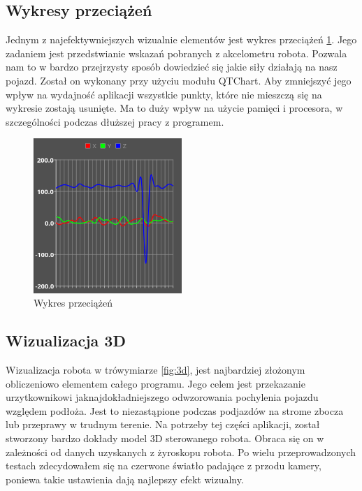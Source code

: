 \documentclass[12pt,a4paper,polish]{article}
\begin{document}
  \subsection{Wykresy przeciążeń}
  Jednym z najefektywniejszych wizualnie elementów jest wykres przeciążeń  \ref{fig:chart}.
  Jego zadaniem jest przedstwianie wskazań pobranych z akcelometru robota.
  Pozwala nam to w bardzo przejrzysty sposób dowiedzieć się jakie siły
  działają na nasz pojazd. Został on wykonany przy użyciu modułu QTChart.
  Aby zmniejszyć jego wpływ na wydajność aplikacji wszystkie punkty, które
  nie mieszczą się na wykresie zostają usunięte. Ma to duży wpływ na użycie
  pamięci i procesora, w szczególności podczas dłuższej pracy z programem.

  \begin{figure}[h]
    \centering
    \includegraphics[width=0.5\textwidth]{img/final/chart.png}
    \caption{Wykres przeciążeń}
    \label{fig:chart}
  \end{figure}

  \subsection{Wizualizacja 3D}
  Wizualizacja robota w trówymiarze \ref{fig:3d}, jest najbardziej złożonym obliczeniowo
  elementem całego programu. Jego celem jest przekazanie urzytkownikowi 
  jaknajdokładniejszego odwzorowania pochylenia pojazdu względem podłoża.
  Jest to niezastąpione podczas podjazdów na strome zbocza lub przeprawy 
  w trudnym terenie. Na potrzeby tej części aplikacji, został stworzony
  bardzo dokłady model 3D sterowanego robota. Obraca się on  w zależności 
  od danych uzyskanych z żyroskopu robota. Po wielu przeprowadzonych
  testach zdecydowałem się na czerwone światło padające z przodu kamery,
  poniewa takie ustawienia dają najlepszy efekt wizualny.
\end{document}
